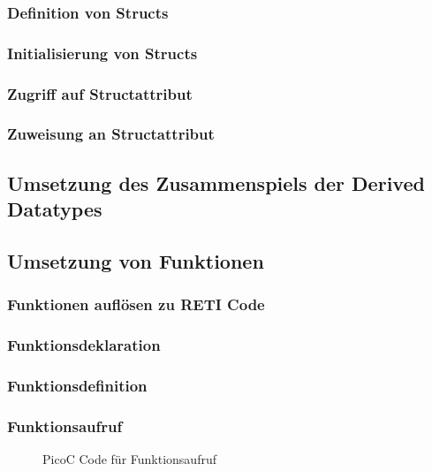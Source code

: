\subsubsection{Definition von Structs}
\subsubsection{Initialisierung von Structs}
\subsubsection{Zugriff auf Structattribut}
\subsubsection{Zuweisung an Structattribut}

\subsection{Umsetzung des Zusammenspiels der Derived Datatypes}

\subsection{Umsetzung von Funktionen}
\subsubsection{Funktionen auflösen zu RETI Code}
\subsubsection{Funktionsdeklaration}
\subsubsection{Funktionsdefinition}
\subsubsection{Funktionsaufruf}
\begin{figure}[H]
  \centering
  \caption{PicoC Code für Funktionsaufruf}
  \label{fig:picoc_code_für_funktionsaufruf}
\end{figure}

